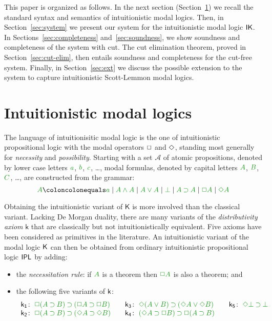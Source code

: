 \documentclass[a4paper]{article}
\begin{document}
 This paper is organized as follows. In the next section (Section~\ref{sec:intmod}) we recall the standard syntax and semantics of intuitionistic modal logics. Then, in Section~\ref{sec:system} we present our system for the intuitionistic modal logic $\mathsf{IK}$. In Sections~\ref{sec:completeness} and~\ref{sec:soundness}, we show soundness and completeness of the system with cut. The cut elimination theorem, proved in Section~\ref{sec:cut-elim}, then entails soundness and completeness for the cut-free system. Finally, in Section~\ref{sec:ext} we discuss the possible extension to the system to capture intuitionistic Scott-Lemmon modal logics.
 \section{Intuitionistic modal logics}\label{sec:intmod}
 
 
 
 The language of {intuitionisitic modal logic} is the one of intuitionistic propositional logic with the modal operators $\mathord{\Box}$ and $\mathord{\Diamond}$, standing most generally for \emph{necessity} and \emph{possibility}.
 Starting with a set $\mathcal{A}$ of atomic propositions, denoted by lower case letters $\fm a$, $\fm b$, $\fm c$, \ldots, modal formulas, denoted by capital letters $\fm A$, $\fm B$, $\fm C$, \ldots, are constructed from the grammar:
 $$
 \fm A \coloncolonequals
 \fm a \mid \fm{A \AND A} \mid \fm{A \OR A} \mid \fm \BOT \mid \fm{A \IMP A} \mid \fm{\BOX A} \mid \fm{\DIA A}
 $$
 
 Obtaining the intuitionistic variant of $\mathsf{K}$ is more involved than the classical variant. 
 Lacking De Morgan duality, there are many variants of the \emph{distributivity axiom} $\mathsf{k}$ that are classically but not intuitionistically equivalent. Five axioms have been considered as primitives in the literature. An intuitionistic variant of the modal logic $\mathsf{K}$ can then be obtained from ordinary intuitionistic propositional logic $\mathsf{IPL}$ by adding:
 
 \begin{itemize}
 	\item the \emph{necessitation rule}: if $\fm A$ is a theorem then $\fm{\BOX A}$ is also a theorem; and
 	\item the following five variants of $\mathsf{k}$:
 	\begin{equation*}
 		\label{eq:ik}%
 		\begin{array}[t]{r@{\;}l@{\qquad}r@{\;}l@{\qquad}r@{\;}l}
 			\kax[1]\colon&\fm{\BOX(A\IMP B)\IMP(\BOX A\IMP\BOX B)}
 			&
 			\kax[3]\colon&\fm{\DIA(A\OR B)\IMP(\DIA A\OR\DIA B)}
 			&
 			\kax[5]\colon&\fm{\DIA\BOT\IMP\BOT}
 			\\
 			\kax[2]\colon&\fm{\BOX(A\IMP B)\IMP(\DIA A\IMP\DIA B)}
 			&
 			\kax[4]\colon&\fm{(\DIA A\IMP \BOX B)\IMP\BOX(A\IMP B)}\\%
 		\end{array}
 	\end{equation*}
 \end{itemize}
 
\end{document}
